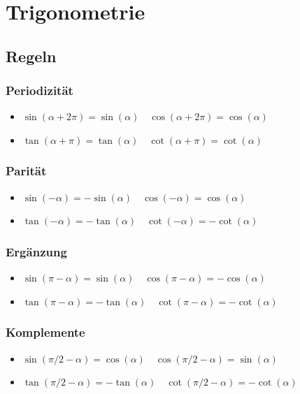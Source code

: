 \documentclass[a4paper,10pt]{article}
\begin{document}
				\section{Trigonometrie}
				
				\subsection{Regeln}
				\subsubsection{Periodizität}
				\begin{itemize}
					\item $\sin(\alpha + 2 \pi) = \sin(\alpha) \quad \cos(\alpha + 2 \pi) = \cos(\alpha)$
					\item $\tan(\alpha + \pi) = \tan(\alpha) \quad \cot(\alpha + \pi) = \cot(\alpha)$
				\end{itemize}
				
				\subsubsection{Parität}
				\begin{itemize}
					\item $\sin(-\alpha) = - \sin(\alpha) \quad \cos(-\alpha) = \cos(\alpha)$
					\item $\tan(-\alpha) = - \tan(\alpha) \quad \cot(-\alpha) = - \cot(\alpha)$
				\end{itemize}
				
				\subsubsection{Ergänzung}
				\begin{itemize}
					\item $\sin(\pi - \alpha) = \sin(\alpha) \quad \cos(\pi - \alpha) = - \cos(\alpha)$
					\item $\tan(\pi - \alpha) = -\tan(\alpha) \quad \cot(\pi - \alpha) = - \cot(\alpha)$
				\end{itemize}
				
				
				\subsubsection{Komplemente}
				\begin{itemize}
					\item $\sin(\pi/2 - \alpha) = \cos(\alpha) \quad \cos(\pi/2 - \alpha) = \sin(\alpha)$
					\item $\tan(\pi/2 - \alpha) = -\tan(\alpha) \quad \cot(\pi/2 - \alpha) = -\cot(\alpha)$
				\end{itemize}
				
\end{document}

